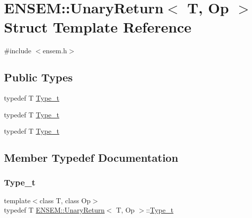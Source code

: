 \hypertarget{structENSEM_1_1UnaryReturn}{}\section{E\+N\+S\+EM\+:\+:Unary\+Return$<$ T, Op $>$ Struct Template Reference}
\label{structENSEM_1_1UnaryReturn}


{\ttfamily \#include $<$ensem.\+h$>$}

\subsection*{Public Types}
\begin{DoxyCompactItemize}
\item 
typedef T \mbox{\hyperlink{structENSEM_1_1UnaryReturn_a16a257c6ea03664cc3e42cbfe2ca219d}{Type\+\_\+t}}
\item 
typedef T \mbox{\hyperlink{structENSEM_1_1UnaryReturn_a16a257c6ea03664cc3e42cbfe2ca219d}{Type\+\_\+t}}
\item 
typedef T \mbox{\hyperlink{structENSEM_1_1UnaryReturn_a16a257c6ea03664cc3e42cbfe2ca219d}{Type\+\_\+t}}
\end{DoxyCompactItemize}


\subsection{Member Typedef Documentation}
\mbox{\label{structENSEM_1_1UnaryReturn_a16a257c6ea03664cc3e42cbfe2ca219d}} 
\subsubsection{\texorpdfstring{Type\_t}{Type\_t}\hspace{0.1cm}{\footnotesize\ttfamily [1/3]}}
{\footnotesize\ttfamily template$<$class T, class Op$>$ \\
typedef T \mbox{\hyperlink{structENSEM_1_1UnaryReturn}{E\+N\+S\+E\+M\+::\+Unary\+Return}}$<$ T, Op $>$\+::\mbox{\hyperlink{structENSEM_1_1UnaryReturn_a16a257c6ea03664cc3e42cbfe2ca219d}{Type\+\_\+t}}}

\mbox{\label{structENSEM_1_1UnaryReturn_a16a257c6ea03664cc3e42cbfe2ca219d}} 
